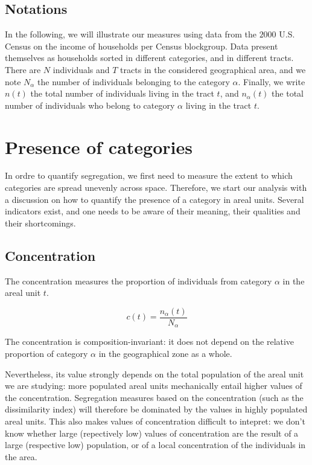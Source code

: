 \subsection{Notations}
\label{sub:notations}

In the following, we will illustrate our measures using data from the $2000$
U.S. Census on the income of households per Census blockgroup. Data present
themselves as households sorted in different categories, and in different
tracts. There are $N$ individuals and  $T$ tracts in the considered geographical
area, and we note $N_\alpha$ the number of individuals belonging to the category
$\alpha$.  Finally, we write $n(t)$ the total number of individuals living in
the tract $t$, and $n_\alpha(t)$ the total number of individuals who belong to
category $\alpha$ living in the tract $t$.



\section{Presence of categories}
\label{sec:presence_of_categories}

In ordre to quantify segregation, we first need to measure the extent to which
categories are spread unevenly across space. Therefore, we start our analysis
with a discussion on how to quantify the presence of a category in areal units.
Several indicators exist, and one needs to be aware of their meaning, their
qualities and their shortcomings. 


\subsection{Concentration}
\label{sub:concentration}

The concentration measures the proportion of individuals from category $\alpha$
in the areal unit $t$. 

\begin{equation}
    c(t) = \frac{n_\alpha(t)}{N_\alpha}
    \label{eq:concentration}
\end{equation}

The concentration is composition-invariant: it
does not depend on the relative proportion of category $\alpha$ in the
geographical zone as a whole. 

Nevertheless, its value strongly depends on the total population of the areal
unit we are studying: more populated areal units mechanically entail higher
values of the concentration. Segregation measures based on the concentration
(such as the dissimilarity index) will therefore be dominated by the values in
highly populated areal units. This also makes values of concentration difficult
to intepret: we don't know whether large (repectively low) values of
concentration are the result of a large (respective low) population, or of a
local concentration of the individuals in the area. 


